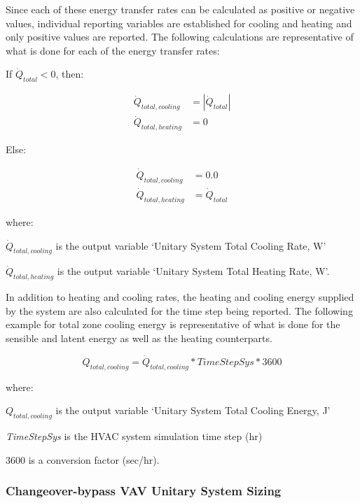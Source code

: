 Since each of these energy transfer rates can be calculated as positive or negative values, individual reporting variables are established for cooling and heating and only positive values are reported. The following calculations are representative of what is done for each of the energy transfer rates:

If $\dot{Q}_{total}<0$, then:

\begin{equation}
  \begin{array}{rl}
    \dot{Q}_{total,cooling} &= \left|\dot{Q}_{total}\right| \\
    \dot{Q}_{total,heating} &= 0
  \end{array}
\end{equation}

Else:

\begin{equation} 
  \begin{array}{rl}
    \dot{Q}_{total,cooling} &= 0.0 \\
    \dot{Q}_{total,heating} &= \dot{Q}_{total}
  \end{array}
\end{equation}

where:

\(\dot{Q}_{total,cooling}\) is the output variable `Unitary System Total Cooling Rate, W'

\(\dot{Q}_{total,heating}\) is the output variable `Unitary System Total Heating Rate, W'.

In addition to heating and cooling rates, the heating and cooling energy supplied by the system are also calculated for the time step being reported. The following example for total zone cooling energy is representative of what is done for the sensible and latent energy as well as the heating counterparts.

\begin{equation}
{Q_{total,cooling}} = {\dot Q_{total,cooling}}*TimeStepSys*3600
\end{equation}

where:

\(Q_{total,cooling}\) is the output variable `Unitary System Total Cooling Energy, J'

\emph{TimeStepSys} is the HVAC system simulation time step (hr)

3600 is a conversion factor (sec/hr).

\subsubsection{Changeover-bypass VAV Unitary System Sizing}\label{changeover-bypass-vav-unitary-system-sizing}

